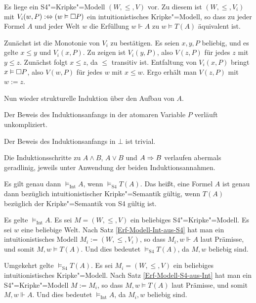 \begin{Satz}\label{Erf-Modell-Int-aus-S4}
Es liege ein S4"=Kripke"=Modell $(W,\le,V)$ vor. Zu diesem ist
$(W,\le,V_i)$ mit $V_i(w,P):\Leftrightarrow (w\vDash\Box P)$ ein
intuitionistisches Kripke"=Modell, so dass zu jeder Formel $A$ und jeder
Welt $w$ die Erfüllung $w\Vdash A$ zu $w\models T(A)$ äquivalent ist.
\end{Satz}
\begin{Beweis}[Beweisskizze]
Zunächst ist die Monotonie von $V_i$ zu bestätigen. Es seien $x,y,P$
beliebig, und es gelte $x\le y$ und $V_i(x,P)$. Zu zeigen ist
$V_i(y,P)$, also $V(z,P)$ für jedes $z$ mit $y\le z$. Zunächst
folgt $x\le z$, da $\le$ transitiv ist. Entfaltung von $V_i(x,P)$
bringt $x\vDash\Box P$, also $V(w,P)$ für jedes $w$ mit $x\le w$.
Ergo erhält man $V(z,P)$ mit $w:=z$.

Nun wieder strukturelle Induktion über den Aufbau von $A$.

Der Beweis des Induktionsanfangs in der atomaren Variable $P$ verläuft
unkompliziert.

Der Beweis des Induktionsanfangs in $\bot$ ist trivial.

Die Induktionsschritte zu $A\land B$, $A\lor B$ und $A\Rightarrow B$ verlaufen
abermals geradlinig, jeweils unter Anwendung der beiden
Induktionsannahmen.\,\qedsymbol
\end{Beweis}

\begin{Satz}
Es gilt genau dann $\models_\text{Int} A$, wenn $\models_\text{S4} T(A)$.
Das heißt, eine Formel $A$ ist genau dann bezüglich intuitionistischer
Kripke"=Semantik gültig, wenn $T(A)$ bezüglich der Kripke"=Semantik von
S4 gültig ist.
\end{Satz}
\begin{Beweis}
Es gelte $\models_\text{Int} A$. Es sei $M=(W,\le,V)$ ein beliebiges
S4"=Kripke"=Modell. Es sei $w$ eine beliebige Welt. Nach Satz
\ref{Erf-Modell-Int-aus-S4}
hat man ein intuitionistisches Modell $M_i:=(W,\le,V_i)$, so dass
$M_i,w\Vdash A$ laut Prämisse, und somit $M,w\models T(A)$. Und dies
bedeutet $\models_\text{S4} T(A)$, da $M,w$ beliebig sind.

Umgekehrt gelte $\models_\text{S4} T(A)$. Es sei $M_i=(W,\le,V)$ ein
beliebiges intuitionistisches Kripke"=Modell. Nach Satz
\ref{Erf-Modell-S4-aus-Int} hat man
ein S4"=Kripke"=Modell $M:=M_i$, so dass $M,w\models T(A)$ laut
Prämisse, und somit $M,w\Vdash A$. Und dies bedeutet
$\models_\text{Int} A$, da $M_i,w$ beliebig sind.\,\qedsymbol
\end{Beweis}

